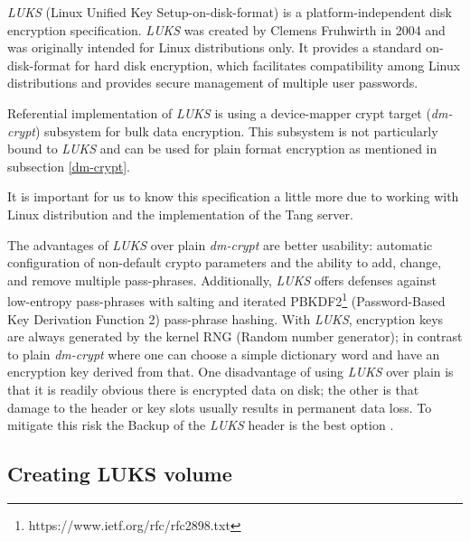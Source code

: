 {\it LUKS} (Linux Unified Key Setup-on-disk-format) is a platform-independent disk encryption specification.
{\it LUKS} was created by Clemens Fruhwirth in 2004 and was originally intended for Linux distributions only.
It provides a standard on-disk-format for hard disk encryption, which facilitates compatibility among Linux distributions and provides secure management of multiple user passwords.

Referential implementation of {\it LUKS} is using a device-mapper crypt target ({\it dm-crypt}) subsystem for bulk data encryption.
This subsystem is not particularly bound to {\it LUKS} and can be used for plain format encryption as mentioned in subsection \ref{dm-crypt}.

It is important for us to know this specification a little more due to working with Linux distribution and the implementation of the Tang server.

The advantages of {\it LUKS} over plain {\it dm-crypt} are better usability: automatic configuration of non-default crypto parameters and the ability to add, change, and remove multiple pass-phrases.
Additionally, {\it LUKS} offers defenses against low-entropy pass-phrases with salting and iterated PBKDF2\footnote{https://www.ietf.org/rfc/rfc2898.txt} (Password-Based Key Derivation Function 2) pass-phrase hashing\cite{RFC2898}.
With {\it LUKS}, encryption keys are always generated by the kernel RNG (Random number generator); in contrast to plain {\it dm-crypt} where one can choose a simple dictionary word and have an encryption key derived from that.
One disadvantage of using {\it LUKS} over plain is that it is readily obvious there is encrypted data on disk; the other is that damage to the header or key slots usually results in permanent data loss.
To mitigate this risk the Backup of the {\it LUKS} header is the best option \cite{fruhwirth2005luks}.



\subsection{Creating LUKS volume}

